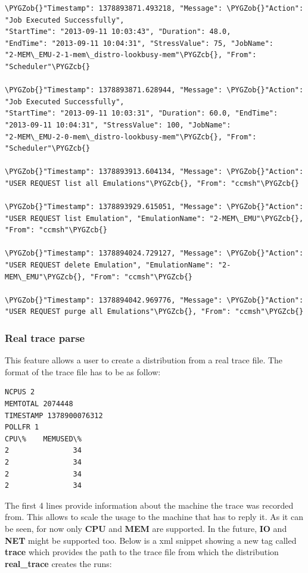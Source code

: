 \documentclass[letterpaper,10pt,english]{sphinxhowto}
\def\PYGZob{\char`\{}
\def\PYGZcb{\char`\}}
\begin{document}
\begin{Verbatim}[commandchars=\\\{\}]
\PYGZob{}"Timestamp": 1378893871.493218, "Message": \PYGZob{}"Action": "Job Executed Successfully",
"StartTime": "2013-09-11 10:03:43", "Duration": 48.0,
"EndTime": "2013-09-11 10:04:31", "StressValue": 75, "JobName":
"2-MEM\_EMU-2-1-mem\_distro-lookbusy-mem"\PYGZcb{}, "From": "Scheduler"\PYGZcb{}

\PYGZob{}"Timestamp": 1378893871.628944, "Message": \PYGZob{}"Action": "Job Executed Successfully",
"StartTime": "2013-09-11 10:03:31", "Duration": 60.0, "EndTime":
"2013-09-11 10:04:31", "StressValue": 100, "JobName":
"2-MEM\_EMU-2-0-mem\_distro-lookbusy-mem"\PYGZcb{}, "From": "Scheduler"\PYGZcb{}

\PYGZob{}"Timestamp": 1378893913.604134, "Message": \PYGZob{}"Action":
"USER REQUEST list all Emulations"\PYGZcb{}, "From": "ccmsh"\PYGZcb{}

\PYGZob{}"Timestamp": 1378893929.615051, "Message": \PYGZob{}"Action":
"USER REQUEST list Emulation", "EmulationName": "2-MEM\_EMU"\PYGZcb{}, "From": "ccmsh"\PYGZcb{}

\PYGZob{}"Timestamp": 1378894024.729127, "Message": \PYGZob{}"Action":
"USER REQUEST delete Emulation", "EmulationName": "2-MEM\_EMU"\PYGZcb{}, "From": "ccmsh"\PYGZcb{}

\PYGZob{}"Timestamp": 1378894042.969776, "Message": \PYGZob{}"Action":
"USER REQUEST purge all Emulations"\PYGZcb{}, "From": "ccmsh"\PYGZcb{}
\end{Verbatim}


\subsubsection{Real trace parse}
\label{COCOMA/06_additional_features:real-trace-parse}
This feature allows a user to create a distribution from a real trace file. The format of the trace file has to be as follow:

\begin{Verbatim}[commandchars=\\\{\}]
NCPUS 2
MEMTOTAL 2074448
TIMESTAMP 1378900076312
POLLFR 1
CPU\%    MEMUSED\%
2               34
2               34
2               34
2               34
\end{Verbatim}

The first 4 lines provide information about the machine the trace was recorded from. This allows to scale the usage to the machine that has to reply it. As it can be seen, for now only \textbf{CPU} and \textbf{MEM} are supported. In the future, \textbf{IO} and \textbf{NET} might be supported too.
Below is a xml snippet showing a new tag called \textbf{trace} which provides the path to the trace file from which the distribution \textbf{real\_trace} creates the runs:
\end{document}
